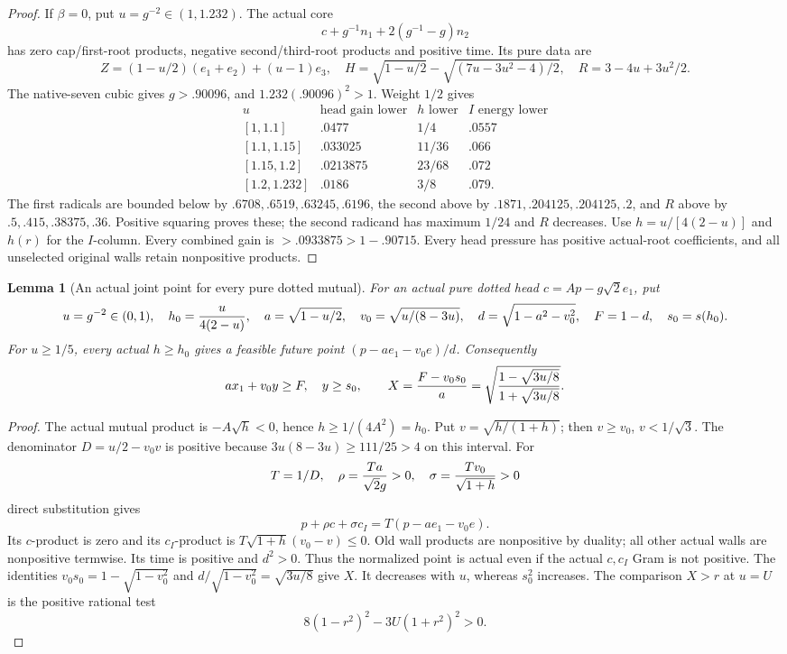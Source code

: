 \documentclass[11pt]{article}
\newtheorem{lemma}[theorem]{Lemma}
\theoremstyle{definition}
\theoremstyle{remark}
\begin{document}
\begin{proof}
If \(\beta=0\), put \(u=g^{-2}\in(1,1.232)\). The actual core
\[
 c+g^{-1}n_1+2(g^{-1}-g)n_2
\]
has zero cap/first-root products, negative second/third-root products
and positive time. Its pure data are
\[
 Z=(1-u/2)(e_1+e_2)+(u-1)e_3,\quad
 H=\sqrt{1-u/2}-\sqrt{(7u-3u^2-4)/2},\quad
 R=3-4u+3u^2/2.
\]
The native-seven cubic gives \(g>.90096\), and
\(1.232(.90096)^2>1\). Weight \(1/2\) gives
\[
\begin{array}{c|c|c|c}
u&\text{head gain lower}&h\text{ lower}&I\text{ energy lower}\\ \hline
{}[1,1.1]&.0477&1/4&.0557\\
{}[1.1,1.15]&.033025&11/36&.066\\
{}[1.15,1.2]&.0213875&23/68&.072\\
{}[1.2,1.232]&.0186&3/8&.079 .
\end{array}
\]
The first radicals are bounded below by
\(.6708,.6519,.63245,.6196\), the second above by
\(.1871,.204125,.204125,.2\), and \(R\) above by
\(.5,.415,.38375,.36\). Positive squaring proves these;
the second radicand has maximum \(1/24\) and \(R\) decreases.
Use \(h=u/[4(2-u)]\) and \(h(r)\) for the \(I\)-column.
Every combined gain is \(>.0933875>1-.90715\).
Every head pressure has positive actual-root coefficients, and all
unselected original walls retain nonpositive products.
\end{proof}

\begin{lemma}[An actual joint point for every pure dotted mutual]
\label{lem:I-pure-dotted-joint-point}
For an actual pure dotted head \(c=Ap-g\sqrt2e_1\), put
\[
 u=g^{-2}\in(0,1),\quad h_0={u\over4(2-u)},\quad
 a=\sqrt{1-u/2},\quad v_0=\sqrt{u/(8-3u)},\quad
 d=\sqrt{1-a^2-v_0^2},\quad F=1-d,\quad s_0=s(h_0).
\]
For \(u\ge1/5\), every actual \(h\ge h_0\) gives a feasible
future point \((p-ae_1-v_0e)/d\). Consequently
\[
 a x_1+v_0y\ge F,\quad y\ge s_0,\qquad
 X={F-v_0s_0\over a}
 =\sqrt{{1-\sqrt{3u/8}\over1+\sqrt{3u/8}}}.
\]
\end{lemma}
\begin{proof}
The actual mutual product is \(-A\sqrt h<0\), hence
\(h\ge1/(4A^2)=h_0\). Put \(v=\sqrt{h/(1+h)}\);
then \(v\ge v_0\), \(v<1/\sqrt3\).
The denominator \(D=u/2-v_0v\) is positive because
\(3u(8-3u)\ge111/25>4\) on this interval. For
\[
 T=1/D,\quad \rho={Ta\over\sqrt2g}>0,\quad
 \sigma={Tv_0\over\sqrt{1+h}}>0
\]
direct substitution gives
\[
 p+\rho c+\sigma c_I=T(p-ae_1-v_0e).
\]
Its \(c\)-product is zero and its \(c_I\)-product is
\(T\sqrt{1+h}(v_0-v)\le0\). Old wall products are nonpositive
by duality; all other actual walls are nonpositive termwise.
Its time is positive and \(d^2>0\). Thus the normalized point is
actual even if the actual \(c,c_I\) Gram is not positive.
The identities \(v_0s_0=1-\sqrt{1-v_0^2}\) and
\(d/\sqrt{1-v_0^2}=\sqrt{3u/8}\) give \(X\).
It decreases with \(u\), whereas \(s_0^2\) increases.
The comparison \(X>r\) at \(u=U\) is the positive rational test
\[
 8(1-r^2)^2-3U(1+r^2)^2>0.
\]
\end{proof}
\end{document}
